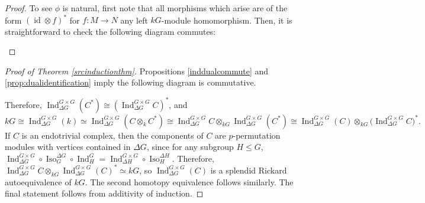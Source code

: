 \documentclass[10pt,letterpaper, boxed, cm]{amsart}
\newcommand{\Ind}{\operatorname{Ind}}
\newcommand{\Iso}{\operatorname{Iso}}
\newcommand{\id}{\operatorname{id}}
\theoremstyle{remark}
\theoremstyle{definition}
\begin{document}
\begin{proof}
        To see $\phi$ is natural, first note that all morphisms which arise are of the form $(\id \otimes f)^*$ for $f: M\to N$ any left $kG$-module homomorphism. Then, it is straightforward to check the following diagram commutes:
		\begin{figure}[H]
			\centering
		\end{figure}
	\end{proof}


	\begin{proof}[Proof of Theorem \ref{srcinductionthm}]
        Propositions \ref{inddualcommute} and \ref{prop:dualidentification} imply the following diagram is commutative.

		\begin{figure}[H]
			\centering
		\end{figure}
		Therefore, $\Ind^{G\times G}_{\Delta G}(C^*) \cong \left(\Ind^{G\times G}_{\Delta G}C\right)^*$, and
		\[kG\cong\Ind^{G\times G}_{\Delta G} (k)\simeq \Ind^{G\times G}_{\Delta G}(C \otimes_{k}C^*) \cong\Ind^{G\times G}_{\Delta G}C\otimes_{kG}\Ind^{G\times G}_{\Delta G}(C^*) \cong \Ind^{G\times G}_{\Delta G}(C)\otimes_{kG}\big(\Ind^{G\times G}_{\Delta G}C\big)^*.\]
		If $C$ is an endotrivial complex, then the components of $C$ are $p$-permutation modules with vertices contained in $\Delta G$, since for any subgroup $H \leq G$, $\Ind^{G\times G}_{\Delta G}\circ \Iso^{\Delta G}_G \circ \Ind^G_H = \Ind^{G\times G}_{\Delta H}\circ \Iso^{\Delta H}_H.$ Therefore, $\Ind^{G\times G}_{\Delta G}C \otimes_{kG}\Ind^{G\times G}_{\Delta G}(C)^* \simeq kG$, so $\Ind^{G\times G}_{\Delta G}(C)$ is a splendid Rickard autoequivalence of $kG$. The second homotopy equivalence follows similarly. The final statement follows from additivity of induction.
	\end{proof}
\end{document}
